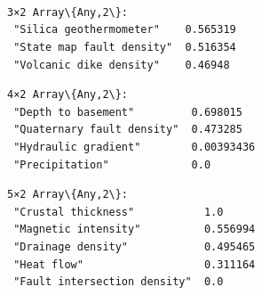 \documentclass[11pt]{article}
\begin{document}
    \begin{Verbatim}[commandchars=\\\{\}]

    \end{Verbatim}

    \begin{center}
    \end{center}
    { \hspace*{\fill} \\}
    
    \begin{center}
    \end{center}
    { \hspace*{\fill} \\}
    
    \begin{Verbatim}[commandchars=\\\{\}]

    \end{Verbatim}

    \begin{center}
    \end{center}
    { \hspace*{\fill} \\}
    
    
    \begin{Verbatim}[commandchars=\\\{\}]
3×2 Array\{Any,2\}:
 "Silica geothermometer"    0.565319
 "State map fault density"  0.516354
 "Volcanic dike density"    0.46948
    \end{Verbatim}

    
    
    \begin{Verbatim}[commandchars=\\\{\}]
4×2 Array\{Any,2\}:
 "Depth to basement"         0.698015
 "Quaternary fault density"  0.473285
 "Hydraulic gradient"        0.00393436
 "Precipitation"             0.0
    \end{Verbatim}

    
    
    \begin{Verbatim}[commandchars=\\\{\}]
5×2 Array\{Any,2\}:
 "Crustal thickness"           1.0
 "Magnetic intensity"          0.556994
 "Drainage density"            0.495465
 "Heat flow"                   0.311164
 "Fault intersection density"  0.0
    \end{Verbatim}
\end{document}
